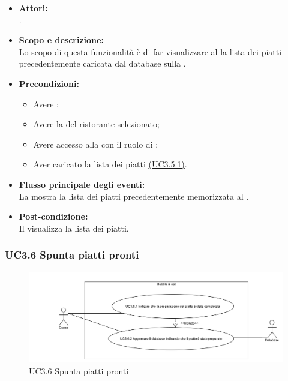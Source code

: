 \begin{itemize}
	\item \textbf{Attori:}
	\\.
	\item \textbf{Scopo e descrizione:} 
	\\Lo scopo di questa funzionalità è di far visualizzare al  la lista dei piatti precedentemente caricata dal database sulla .
	\item \textbf{Precondizioni:}
	\begin{itemize}
		\item Avere ;
		\item Avere la  del ristorante selezionato;
		\item Avere accesso alla  con il ruolo di ;
		\item Aver caricato la lista dei piatti \hyperref[UC3.5.1]{(UC3.5.1)}.
	\end{itemize}
	\item \textbf{Flusso principale degli eventi:}
	\\La {} mostra la lista dei piatti precedentemente memorizzata al .
	\item \textbf{Post-condizione:}
	\\Il {} visualizza la lista dei piatti.
\end{itemize}

\subsubsection{UC3.6 Spunta piatti pronti} \label{UC3.6}

\begin{figure}[H]
	\centering
	\includegraphics[width=15cm]{../../documenti/AnalisiDeiRequisiti/Diagrammi_img/uc3_6.png}
	\caption{UC3.6 Spunta piatti pronti}
\end{figure}

